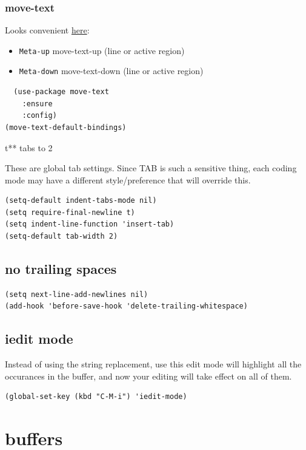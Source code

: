 \documentclass[11pt]{article}
\begin{document}
\subsubsection{move-text}
\label{sec:orgdd3b660}

Looks convenient \href{https://github.com/emacsfodder/move-text}{here}:
\begin{itemize}
\item \texttt{Meta-up} move-text-up (line or active region)
\item \texttt{Meta-down} move-text-down (line or active region)
\end{itemize}

\begin{verbatim}
  (use-package move-text
    :ensure
    :config)
(move-text-default-bindings)
\end{verbatim}

t** tabs to 2

These are global tab settings. Since TAB is such a sensitive thing,
each coding mode may have a different style/preference that will
override this.

\begin{verbatim}
(setq-default indent-tabs-mode nil)
(setq require-final-newline t)
(setq indent-line-function 'insert-tab)
(setq-default tab-width 2)
\end{verbatim}
\subsection{no trailing spaces}
\label{sec:orge180548}
\begin{verbatim}
(setq next-line-add-newlines nil)
(add-hook 'before-save-hook 'delete-trailing-whitespace)
\end{verbatim}
\subsection{iedit mode}
\label{sec:org8a48dc4}

Instead of using the string replacement, use this edit mode will
highlight all the occurances in the buffer, and now your editing will
take effect on all of them.

\begin{verbatim}
(global-set-key (kbd "C-M-i") 'iedit-mode)
\end{verbatim}

\section{buffers}
\label{sec:org1ded03f}
\end{document}
